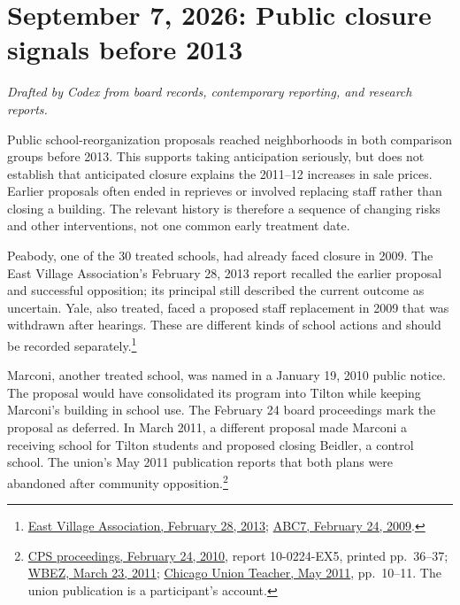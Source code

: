 \section*{September 7, 2026: Public closure signals before 2013}
\textit{Drafted by Codex from board records, contemporary reporting, and research reports.}

Public school-reorganization proposals reached neighborhoods in both comparison
groups before 2013. This supports taking anticipation seriously, but does not
establish that anticipated closure explains the 2011--12 increases in sale
prices. Earlier proposals often ended in reprieves or involved replacing staff
rather than closing a building. The relevant history is therefore a sequence of
changing risks and other interventions, not one common early treatment date.

Peabody, one of the 30 treated schools, had already faced closure in 2009.
The East Village Association's February 28, 2013 report recalled the earlier
proposal and successful opposition; its principal still described the current
outcome as uncertain. Yale, also treated, faced a proposed staff replacement
in 2009 that was withdrawn after hearings. These are different kinds of school
actions and should be recorded separately.\footnote{\href{https://www.eastvillagechicago.org/2013/02/peabody-school-again-closing-target.html}{East Village Association, February 28, 2013}; \href{https://abc7chicago.com/archive/6675416/}{ABC7, February 24, 2009}.}

Marconi, another treated school, was named in a January 19, 2010 public notice.
The proposal would have consolidated its program into Tilton while keeping
Marconi's building in school use. The February 24 board proceedings mark the
proposal as deferred. In March 2011, a different proposal made Marconi a receiving
school for Tilton students and proposed closing Beidler, a control school.
The union's May 2011 publication reports that both plans were abandoned after
community opposition.\footnote{\href{https://www.cpsboe.org/content/documents/feb24_2010proceedings.pdf}{CPS proceedings, February 24, 2010}, report 10-0224-EX5, printed pp.~36--37; \href{https://www.wbez.org/eight-forty-eight/2011/03/23/task-forces-recommendations-for-cps-school-closings}{WBEZ, March 23, 2011}; \href{https://www.ctulocal1.org/wp-content/uploads/2018/11/2011-05.pdf}{Chicago Union Teacher, May 2011}, pp.~10--11. The union publication is a participant's account.}

